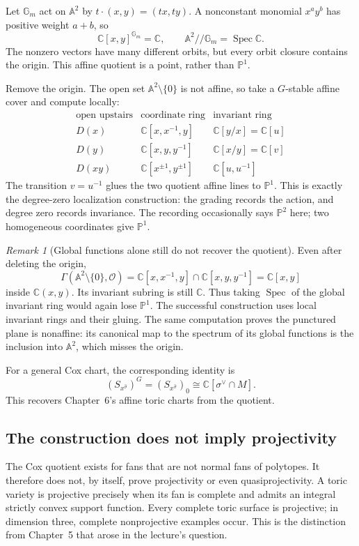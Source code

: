 \documentclass[11pt]{article}
\theoremstyle{definition}
\theoremstyle{remark}
\newtheorem{Rmk}{Remark}
\DeclareMathOperator{\Spec}{Spec}
\newcommand{\A}{\mathbb A}
\newcommand{\Pj}{\mathbb P}
\newcommand{\C}{\mathbb C}
\newcommand{\Gm}{\mathbb G_m}
\newcommand{\OO}{\mathcal O}
\begin{document}
Let \(\Gm\) act on \(\A^2\) by
\(t\cdot(x,y)=(tx,ty)\). A nonconstant monomial \(x^ay^b\)
has positive weight \(a+b\), so
\[
\C[x,y]^{\Gm}=\C,\qquad
\A^2\mathbin{//}\Gm=\Spec\C.
\]
The nonzero vectors have many different orbits, but every orbit
closure contains the origin. This affine quotient is a point,
rather than \(\Pj^1\).

Remove the origin. The open set \(\A^2\setminus\{0\}\) is not
affine, so take a \(G\)-stable affine cover and compute locally:
\[
\begin{array}{c|c|c}
\text{open upstairs}&\text{coordinate ring}&\text{invariant ring}\\ \hline
D(x)&\C[x,x^{-1},y]&\C[y/x]=\C[u]\\
D(y)&\C[x,y,y^{-1}]&\C[x/y]=\C[v]\\
D(xy)&\C[x^{\pm1},y^{\pm1}]&\C[u,u^{-1}]
\end{array}
\]
The transition \(v=u^{-1}\) glues the two quotient affine lines to
\(\Pj^1\). This is exactly the degree-zero localization construction:
the grading records the action, and degree zero records invariance.
The recording occasionally says \(\Pj^2\) here; two homogeneous
coordinates give \(\Pj^1\).

\begin{Rmk}[Global functions alone still do not recover the quotient]
Even after deleting the origin,
\[
\Gamma(\A^2\setminus\{0\},\OO)
=\C[x,x^{-1},y]\cap\C[x,y,y^{-1}]=\C[x,y]
\]
inside \(\C(x,y)\). Its invariant subring is still \(\C\).
Thus taking \(\Spec\) of the global invariant ring would again
lose \(\Pj^1\). The successful construction uses local invariant
rings and their gluing. The same computation proves the punctured
plane is nonaffine: its canonical map to the spectrum of its global
functions is the inclusion into \(\A^2\), which misses the origin.
\end{Rmk}

For a general Cox chart, the corresponding identity is
\[
\left(S_{x^{\widehat\sigma}}\right)^G
=\left(S_{x^{\widehat\sigma}}\right)_0
\cong\C[\sigma^\vee\cap M].
\]
This recovers Chapter~6's affine toric charts from the quotient.

\subsection{The construction does not imply projectivity}

The Cox quotient exists for fans that are not normal fans of
polytopes. It therefore does not, by itself, prove projectivity or
even quasiprojectivity. A toric variety is projective precisely when
its fan is complete and admits an integral strictly convex support
function. Every complete toric surface is projective; in dimension
three, complete nonprojective examples occur. This is the distinction
from Chapter~5 that arose in the lecture's question.
\end{document}
